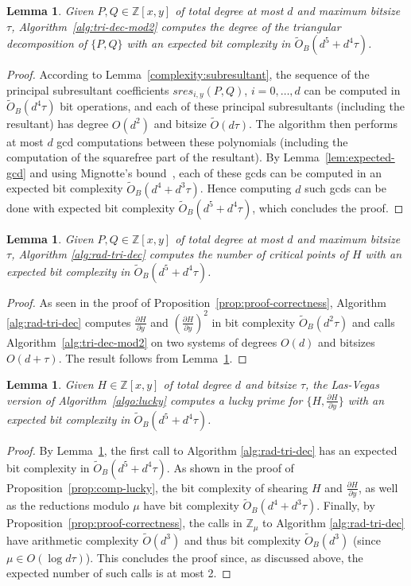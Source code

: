 \documentclass{sig-alternate}
\newtheorem{lemma}[theorem]{Lemma}
\newcommand {\Z}   {\mathbb Z}
\newcommand{\OO}{\ensuremath{{{O}}}}
\newcommand{\sO}{\ensuremath{\widetilde{{O}}}}
\newcommand{\sOB}{\ensuremath{\widetilde{{O}}_B}}
\begin{document}
\begin{lemma}\label{lem:lem:tridec_pair-exp}
Given  $P,Q \in \Z[x,y]$ of total degree at most $d$ and maximum bitsize $\tau$,
Algorithm~\ref{alg:tri-dec-mod2} computes the degree of the triangular decomposition of $\{P,Q\}$ 
with an expected bit complexity in $\sOB(d^5+d^4{\tau})$. 
\end{lemma}
\begin{proof}
According to Lemma~\ref{complexity:subresultant}, the sequence of the principal subresultant
coefficients $sres_{i,y}(P,Q)$, $i=0,\ldots,d$ can be computed in  $\sOB(d^4\tau)$ bit operations,
and each of these principal subresultants (including the resultant) has degree $\OO(d^2)$ and bitsize
$\sO(d\tau)$. The algorithm then performs  at most $d$ gcd computations between these polynomials
(including the computation of the squarefree part of the resultant). By Lemma~\ref{lem:expected-gcd}
and using Mignotte's bound~\cite[Cor. 10.12]{BPR06}, each of these gcds can be computed in  an
expected bit complexity $\sOB(d^4+d^3\tau)$. Hence computing $d$ such
gcds can be done with expected bit complexity $\sOB(d^5+d^4\tau)$, which concludes the proof.
\end{proof}

\begin{lemma}\label{lem:proof-correctness-exp}
Given  $P,Q \in \Z[x,y]$ of total degree at most $d$ and maximum bitsize $\tau$,
  Algorithm \ref{alg:rad-tri-dec} 
computes the number of critical points of $H$ 
with an expected bit complexity in $\sOB(d^5+d^4{\tau})$. 
\end{lemma}
\begin{proof}
As seen in the proof of Proposition~\ref{prop:proof-correctness}, Algorithm \ref{alg:rad-tri-dec}
computes $\frac{\partial H}{\partial y}$ and $(\frac{\partial H}{\partial y})^2$ in bit complexity
$\sOB(d^2\tau)$ and calls Algorithm~\ref{alg:tri-dec-mod2} on two systems of degrees $O(d)$ and
bitsizes $O(d+\tau)$. The result follows from Lemma~\ref{lem:lem:tridec_pair-exp}.
\end{proof}


\begin{lemma}\label{lem:lucky-exp}
Given $H \in \Z[x,y]$ of total degree $d$ and bitsize $\tau$, 
the Las-Vegas version of Algorithm~\ref{algo:lucky} computes a lucky prime  for $\{H,\frac{\partial H}{\partial y}\}$ with an expected bit complexity in  $\sOB(d^5+d^4\tau)$.
\end{lemma}
\begin{proof}
By Lemma~\ref{lem:proof-correctness-exp}, the first call to Algorithm \ref{alg:rad-tri-dec} has
an expected bit complexity in $\sOB(d^5+d^4{\tau})$. As shown in the proof of Proposition~\ref{prop:comp-lucky}, the
bit complexity of shearing $H$ and $\frac{\partial H}{\partial y}$, as well as the reductions modulo
$\mu$ have  bit complexity $\sOB(d^4+d^3{\tau})$. Finally, by Proposition~\ref{prop:proof-correctness}, the calls  in $\Z_\mu$ to Algorithm
\ref{alg:rad-tri-dec} have arithmetic complexity $\sO(d^3)$ and thus bit complexity $\sOB(d^3)$
(since $\mu\in \OO(\log d\tau)$). This concludes the proof since, as discussed above,  the expected number of such calls is
at most 2.
\end{proof}
\end{document}
